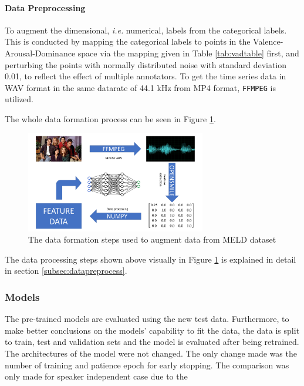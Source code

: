 \documentclass[a4paper,11pt]{article}
\begin{document}
\paragraph{Data Preprocessing}

To augment the dimensional, \textit{i.e.} numerical, labels from the categorical labels. This is conducted by mapping the categorical labels to points in the Valence-Arousal-Dominance space via the mapping given in Table \ref{tab:vadtable} first, and perturbing the points with normally distributed noise with standard deviation 0.01, to reflect the effect of multiple annotators. To get the time series data in WAV format in the same datarate of 44.1 kHz from MP4 format, \texttt{FFMPEG} is utilized.   

The whole data formation process can be seen in Figure \ref{fig:dataformation}.

\begin{figure}[h]
\centering
\includegraphics[width=0.7\textwidth]{Presentation.png}
\caption{The data formation steps used to augment data from MELD dataset}\label{fig:dataformation}
\end{figure}

The data processing steps shown above visually in Figure \ref{fig:dataformation} is explained in detail in section \ref{subsec:datapreprocess}.

\pagebreak

\subsubsection{Models}

The pre-trained models are evaluated using the new test data. Furthermore, to make better conclusions on the models' capability to fit the data, the data is split to train, test and validation sets and the model is evaluated after being retrained. The architectures of the model were not changed. The only change made was the number of training and patience epoch for early stopping. The comparison was only made for speaker independent case due to the 
\end{document}
